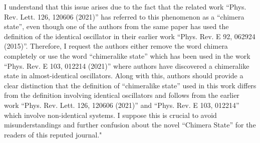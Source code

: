 \documentclass[aps,prb,reprint,showpacs,floatfix,superscriptaddress, onecolumn, nofootinbib, 10pt]{revtex4-2}
\begin{document}
\begin{enumerate}
\begin{enumerate}
{			I understand that this issue arises due to the fact that the related work “Phys. Rev. Lett. 126, 120606 (2021)” has referred to this phenomenon as a “chimera state”, even though one of the authors from the same paper has used the definition of the identical oscillator in their earlier work “Phys. Rev. E 92, 062924 (2015)”. Therefore, I request the authors either remove the word chimera completely or use the word “chimeralike state” which has been used in the work “Phys. Rev. E 103, 012214 (2021)” where authors have discovered a chimeralike state in almost-identical oscillators. Along with this, authors should provide a clear distinction that the definition of “chimeralike state” used in this work differs from the definition involving identical oscillators and follows from the earlier work “Phys. Rev. Lett. 126, 120606 (2021)” and “Phys. Rev. E 103, 012214” which involve non-identical systems. I
			suppose this is crucial to avoid misunderstandings and further confusion about the novel “Chimera State” for the readers of this reputed journal."}\\
		

\end{enumerate}
\end{enumerate}
\end{document}

